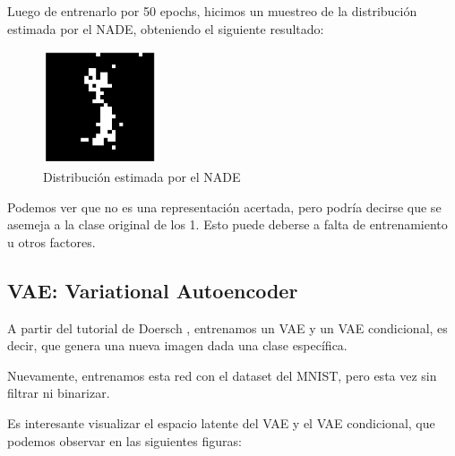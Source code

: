 \documentclass[11pt]{article}
\begin{document}
Luego de entrenarlo por 50 epochs, hicimos un muestreo de la distribución estimada por el NADE, obteniendo el siguiente resultado:

\begin{figure}[h]
    \centering
    \includegraphics[width=0.3\textwidth]{NADE/nade_generation.png}
    \caption{Distribución estimada por el NADE}
    \label{fig:nade_gen}
\end{figure}

Podemos ver que no es una representación acertada, pero podría decirse que se asemeja a la clase original de los 1. Esto puede deberse a falta de entrenamiento u otros factores.
\newpage
\subsection{VAE: Variational Autoencoder}

A partir del tutorial de Doersch \cite{vae}, entrenamos un VAE y un VAE condicional, es decir, que genera una nueva imagen dada una clase específica.

Nuevamente, entrenamos esta red con el dataset del MNIST, pero esta vez sin filtrar ni binarizar.

Es interesante visualizar el espacio latente del VAE y el VAE condicional, que podemos observar en las siguientes figuras:
\end{document}
